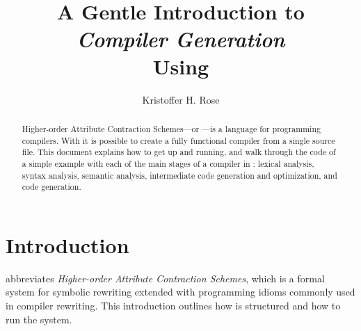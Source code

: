 \documentclass[11pt]{article} %
\title{A Gentle Introduction to\\\emph{Compiler Generation}\\Using \HAX\version}
\author{Kristoffer H. Rose}
\begin{document}
\maketitle

\begin{abstract}\noindent
  Higher-order Attribute Contraction Schemes---or \HAX---is a language for programming compilers.
  With \HAX it is possible to create a fully functional compiler from a single source file.  This
  document explains how to get \HAX up and running, and walk through the code of a simple example
  with each of the main stages of a compiler in \HAX: lexical analysis, syntax analysis, semantic
  analysis, intermediate code generation and optimization, and code generation.
\end{abstract}

\compacttableofcontents


\section{Introduction}

\HAX abbreviates \emph{Higher-order Attribute Contraction Schemes}, which is a formal system for
symbolic rewriting extended with programming idioms commonly used in compiler rewriting.  This
introduction outlines how \HAX is structured and how to run the \HAX system.
\end{document}
